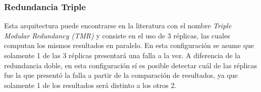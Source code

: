 


\subsubsection{Redundancia Triple}

Esta arquitectura puede encontrarse en la literatura con el nombre \textit{Triple Modular Redundancy (TMR)} \cite{lyons1962use} y consiste en el uso de 3 réplicas, las cuales computan los mismos resultados en paralelo. En esta configuración se asume que solamente 1 de las 3 réplicas presentará una falla a la vez. A diferencia de la redundancia doble, en esta configuración sí es posible detectar cuál de las réplicas fue la que presentó la falla a partir de la comparación de resultados, ya que solamente 1 de los resultados será distinto a los otros 2.

